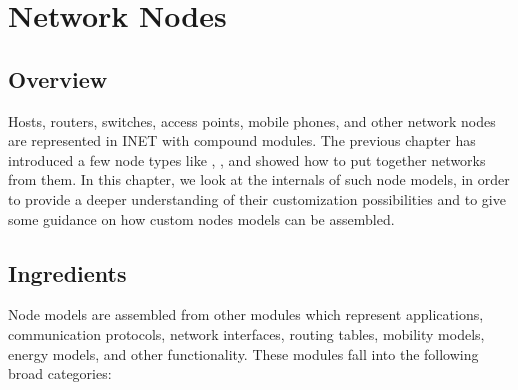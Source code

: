 \chapter{Network Nodes}
\label{cha:network-nodes}

\section{Overview}

Hosts, routers, switches, access points, mobile phones, and other network
nodes are represented in INET with compound modules. The previous chapter 
has introduced a few node types like , , 
and showed how to put together networks from them. In this chapter,
we look at the internals of such node models, in order to provide a deeper
understanding of their customization possibilities and to give some guidance
on how custom nodes models can be assembled.

\section{Ingredients}

Node models are assembled from other modules which represent applications, 
communication protocols, network interfaces, routing tables, mobility models, 
energy models, and other functionality. These modules fall into the following
broad categories:

